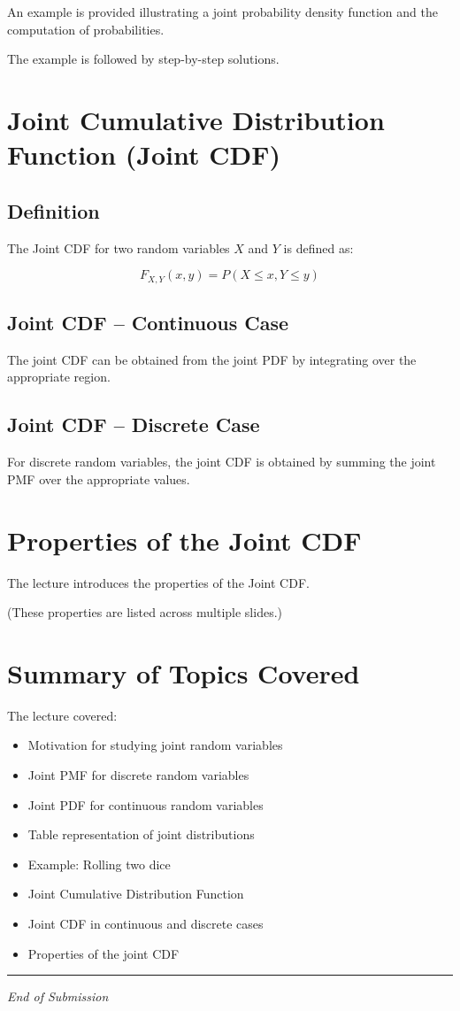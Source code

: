 \documentclass[11pt]{article}
\begin{document}
An example is provided illustrating a joint probability density function and the computation of probabilities.

The example is followed by step-by-step solutions.

\section{Joint Cumulative Distribution Function (Joint CDF)}

\subsection{Definition}

The Joint CDF for two random variables $X$ and $Y$ is defined as:

\[
F_{X,Y}(x,y) = P(X \le x, Y \le y)
\]

\subsection{Joint CDF – Continuous Case}

The joint CDF can be obtained from the joint PDF by integrating over the appropriate region.

\subsection{Joint CDF – Discrete Case}

For discrete random variables, the joint CDF is obtained by summing the joint PMF over the appropriate values.

\section{Properties of the Joint CDF}

The lecture introduces the properties of the Joint CDF.

(These properties are listed across multiple slides.)

\section{Summary of Topics Covered}

The lecture covered:

\begin{itemize}
\item Motivation for studying joint random variables
\item Joint PMF for discrete random variables
\item Joint PDF for continuous random variables
\item Table representation of joint distributions
\item Example: Rolling two dice
\item Joint Cumulative Distribution Function
\item Joint CDF in continuous and discrete cases
\item Properties of the joint CDF
\end{itemize}

\bigskip
\hrule
\vspace{0.2cm}
\begin{center}
    \small \textit{End of Submission}
\end{center}
\end{document}
